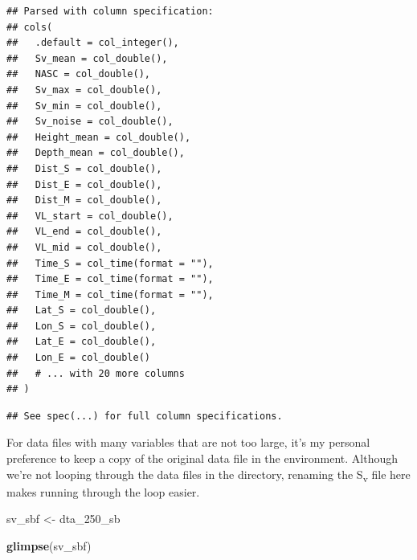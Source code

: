 \documentclass[]{article}
\newenvironment{Shaded}{\begin{snugshade}}{\end{snugshade}}
\newcommand{\DecValTok}[1]{\textcolor[rgb]{0.00,0.00,0.81}{#1}}
\newcommand{\KeywordTok}[1]{\textcolor[rgb]{0.13,0.29,0.53}{\textbf{#1}}}
\newcommand{\NormalTok}[1]{#1}
\newcommand{\StringTok}[1]{\textcolor[rgb]{0.31,0.60,0.02}{#1}}
\begin{document}
\begin{verbatim}
## Parsed with column specification:
## cols(
##   .default = col_integer(),
##   Sv_mean = col_double(),
##   NASC = col_double(),
##   Sv_max = col_double(),
##   Sv_min = col_double(),
##   Sv_noise = col_double(),
##   Height_mean = col_double(),
##   Depth_mean = col_double(),
##   Dist_S = col_double(),
##   Dist_E = col_double(),
##   Dist_M = col_double(),
##   VL_start = col_double(),
##   VL_end = col_double(),
##   VL_mid = col_double(),
##   Time_S = col_time(format = ""),
##   Time_E = col_time(format = ""),
##   Time_M = col_time(format = ""),
##   Lat_S = col_double(),
##   Lon_S = col_double(),
##   Lat_E = col_double(),
##   Lon_E = col_double()
##   # ... with 20 more columns
## )
\end{verbatim}

\begin{verbatim}
## See spec(...) for full column specifications.
\end{verbatim}

For data files with many variables that are not too large, it's my
personal preference to keep a copy of the original data file in the
environment. Although we're not looping through the data files in the
directory, renaming the S\textsubscript{v} file here makes running
through the loop easier.

\begin{Shaded}
\begin{Highlighting}[]
\NormalTok{sv_sbf <-}\StringTok{ }\NormalTok{dta_}\DecValTok{250}\NormalTok{_sb}

\KeywordTok{glimpse}\NormalTok{(sv_sbf)}
\end{Highlighting}
\end{Shaded}
\end{document}

